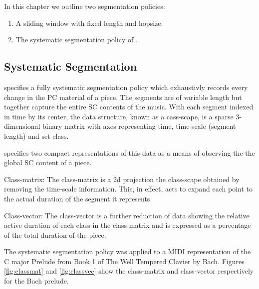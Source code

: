 \documentclass{article}
\begin{document}
In this chapter we outline two segmentation policies:
\begin{enumerate}
\item A sliding window with fixed length and hopsize.
\item The systematic segmentation policy of \citet{Martorell2013}.
\end{enumerate}
\subsection{Systematic Segmentation}
\label{sec-8-1}

\citet[chap. 5.3]{Martorell2013} specifies a fully systematic
segmentation policy which exhaustivly records every change in the PC
material of a piece. The segments are of variable length but together
capture the entire SC contents of the music. With each segment indexed
in time by its center, the data structure, known as a cass-scape, is a
sparse 3-dimensional binary matrix with axes representing time,
time-scale (segment length) and set class. 

\citet[chap. 5.3.5]{Martorell2013} specifies two compact
representations of this data as a means of observing the the global SC
content of a piece.

Class-matrix: The class-matrix is a 2d projection the class-scape
obtained by removing the time-scale information. This, in effect, acts
to expand each point to the actual duration of the segment it
represents.

Class-vector: The class-vector is a further reduction of data showing
the relative active duration of each class in the class-matrix and is
expressed as a percentage of the total duration of the piece.

The systematic segmentation policy was applied to a MIDI
representation of the C major Prelude from Book 1 of The Well Tempered
Clavier by Bach. Figures \ref{fig:classmat} and \ref{fig:classvec}
show the class-matrix and class-vector respectively for the Bach
prelude.
\end{document}
